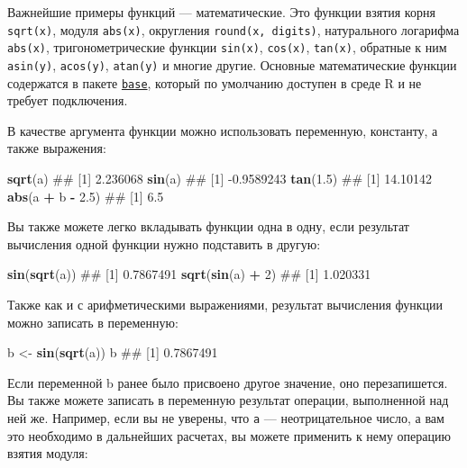 \documentclass[]{book}
\newenvironment{Shaded}{\begin{snugshade}}{\end{snugshade}}
\newcommand{\KeywordTok}[1]{\textcolor[rgb]{0.13,0.29,0.53}{\textbf{#1}}}
\newcommand{\DecValTok}[1]{\textcolor[rgb]{0.00,0.00,0.81}{#1}}
\newcommand{\FloatTok}[1]{\textcolor[rgb]{0.00,0.00,0.81}{#1}}
\newcommand{\StringTok}[1]{\textcolor[rgb]{0.31,0.60,0.02}{#1}}
\newcommand{\OperatorTok}[1]{\textcolor[rgb]{0.81,0.36,0.00}{\textbf{#1}}}
\newcommand{\NormalTok}[1]{#1}
\begin{document}
Важнейшие примеры функций --- математические. Это функции взятия корня
\texttt{sqrt(x)}, модуля \texttt{abs(x)}, округления
\texttt{round(x,\ digits)}, натурального логарифма \texttt{abs(x)},
тригонометрические функции \texttt{sin(x)}, \texttt{cos(x)},
\texttt{tan(x)}, обратные к ним \texttt{asin(y)}, \texttt{acos(y)},
\texttt{atan(y)} и многие другие. Основные математические функции
содержатся в пакете
\href{https://stat.ethz.ch/R-manual/R-devel/library/base/html/00Index.html}{\texttt{base}},
который по умолчанию доступен в среде R и не требует подключения.

В качестве аргумента функции можно использовать переменную, константу, а
также выражения:

\begin{Shaded}
\begin{Highlighting}[]
\KeywordTok{sqrt}\NormalTok{(a)}
\NormalTok{## [1] 2.236068}
\KeywordTok{sin}\NormalTok{(a)}
\NormalTok{## [1] -0.9589243}
\KeywordTok{tan}\NormalTok{(}\FloatTok{1.5}\NormalTok{)}
\NormalTok{## [1] 14.10142}
\KeywordTok{abs}\NormalTok{(a }\OperatorTok{+}\StringTok{ }\NormalTok{b }\OperatorTok{-}\StringTok{ }\FloatTok{2.5}\NormalTok{)}
\NormalTok{## [1] 6.5}
\end{Highlighting}
\end{Shaded}

Вы также можете легко вкладывать функции одна в одну, если результат
вычисления одной функции нужно подставить в другую:

\begin{Shaded}
\begin{Highlighting}[]
\KeywordTok{sin}\NormalTok{(}\KeywordTok{sqrt}\NormalTok{(a))}
\NormalTok{## [1] 0.7867491}
\KeywordTok{sqrt}\NormalTok{(}\KeywordTok{sin}\NormalTok{(a) }\OperatorTok{+}\StringTok{ }\DecValTok{2}\NormalTok{)}
\NormalTok{## [1] 1.020331}
\end{Highlighting}
\end{Shaded}

Также как и с арифметическими выражениями, результат вычисления функции
можно записать в переменную:

\begin{Shaded}
\begin{Highlighting}[]
\NormalTok{b <-}\StringTok{ }\KeywordTok{sin}\NormalTok{(}\KeywordTok{sqrt}\NormalTok{(a))}
\NormalTok{b}
\NormalTok{## [1] 0.7867491}
\end{Highlighting}
\end{Shaded}

Если переменной b ранее было присвоено другое значение, оно
перезапишется. Вы также можете записать в переменную результат операции,
выполненной над ней же. Например, если вы не уверены, что \texttt{a} ---
неотрицательное число, а вам это необходимо в дальнейших расчетах, вы
можете применить к нему операцию взятия модуля:
\end{document}
